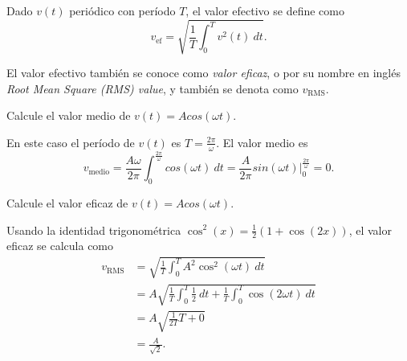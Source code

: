 \documentclass[paper=letter, fontsize=11pt]{scrartcl}
\begin{document}
\begin{defi}
  Dado $v(t)$ periódico con período $T$, el valor efectivo se define como
  \begin{equation}
    \label{eq:vmedio}
    v_{\text{ef}}  = \sqrt{\frac{1}{T} \int_0^T v^2(t) \ dt}.
  \end{equation}
\end{defi}

El valor efectivo también se conoce como \emph{valor eficaz}, o por su nombre
en inglés \emph{Root Mean Square (RMS) value}, y también se denota como
$v_{\text{RMS}}$.

\begin{ex}
  Calcule el valor medio de $v(t) = A cos(\omega t)$.

  En este caso el período de $v(t)$ es $T = \frac{2\pi}{\omega}$. El valor
  medio es
  \begin{equation*}
    v_{\text{medio}} = \frac{A \omega}{2\pi} \int_0^{\frac{2\pi}{\omega}} cos(\omega t)
      \ dt = \frac{A}{2\pi} sin(\omega t) \biggr|_0^{\frac{2\pi}{\omega}} = 0.
  \end{equation*}
\end{ex}

\begin{ex}
  Calcule el valor eficaz de $v(t) = A cos(\omega t)$.

  Usando la identidad trigonométrica $\cos^2(x) = \frac{1}{2}(1 + \cos(2x))$,
  el valor eficaz se calcula como
  \begin{equation*}
    \begin{split}
      v_{\text{RMS}} &= \sqrt{\frac{1}{T} \int_0^T A^2 \cos^2(\omega t) \ dt}\\
      &= A \sqrt{\frac{1}{T} \int_0^T \frac{1}{2} \ dt +
        \frac{1}{T} \int_0^T \cos(2\omega t) \ dt}\\
      &= A \sqrt{\frac{1}{2T} T + 0} \\
      &= \frac{A}{\sqrt{2}}.
    \end{split}
  \end{equation*}
\end{ex}
\end{document}
